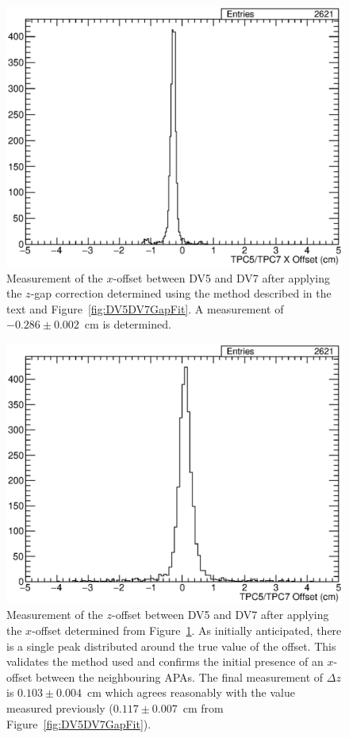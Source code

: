\begin{figure}
  \centering
  \includegraphics[width=12cm]{TPC5TPC7XOff.eps}
  \caption[Measurement of the $x$-offset between DV5 and DV7 after applying the $z$-gap correction.]{Measurement of the $x$-offset between DV5 and DV7 after applying the $z$-gap correction determined using the method described in the text and Figure~\ref{fig:DV5DV7GapFit}.  A measurement of $-0.286\pm0.002$~cm is determined.}
  \label{fig:DV5DV7XOff}
\end{figure}

\begin{figure}
  \centering
  \includegraphics[width=12cm]{TPC5TPC7ZOff.eps}
  \caption[of the $z$-offset between DV5 and DV7 after applying the $x$-offset previously determined.]{Measurement of the $z$-offset between DV5 and DV7 after applying the $x$-offset determined from Figure~\ref{fig:DV5DV7XOff}.  As initially anticipated, there is a single peak distributed around the true value of the offset.  This validates the method used and confirms the initial presence of an $x$-offset between the neighbouring APAs.  The final measurement of $\Delta z$ is $0.103\pm0.004$~cm which agrees reasonably with the value measured previously ($0.117\pm0.007$~cm from Figure~\ref{fig:DV5DV7GapFit}).}
  \label{fig:DV5DV7ZOff}
\end{figure}

